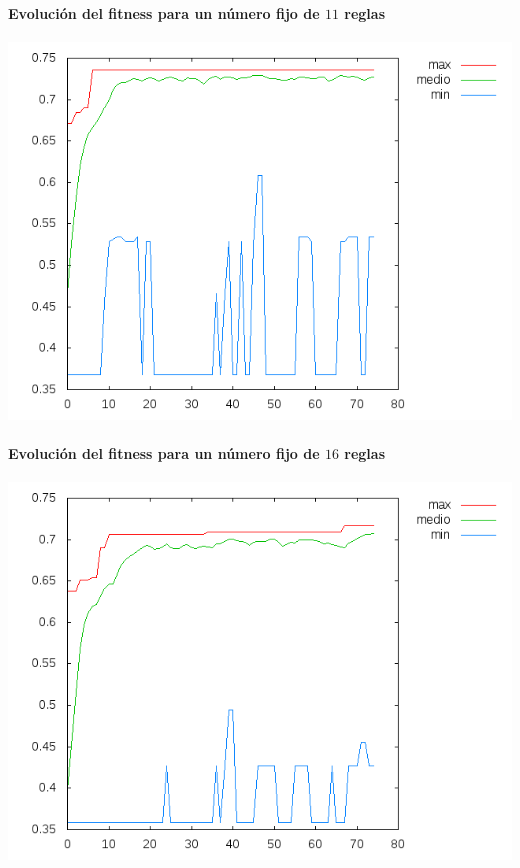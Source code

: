 \documentclass[nochap]{apuntes}
\begin{document}
\paragraph{Evolución del fitness para un número fijo de $11$ reglas}
\begin{center}
\includegraphics[scale=0.6]{tex/img/g75_p75_MejoresPorPeores_SeleccionProporcionalAlFitness_reg11.png}
\end{center}
\paragraph{Evolución del fitness para un número fijo de $16$ reglas}
\begin{center}
\includegraphics[scale=0.6]{tex/img/g75_p75_MejoresPorPeores_SeleccionProporcionalAlFitness_reg16.png}
\end{center}
\end{document}
